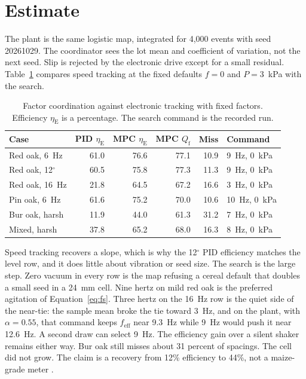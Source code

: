 \documentclass[11pt,a4paper]{article}
\begin{document}
\section{Estimate}

The plant is the same logistic map, integrated for 4{,}000 events with seed 20261029. The coordinator sees the lot mean and coefficient of variation, not the next seed. Slip is rejected by the electronic drive except for a small residual. Table~\ref{tab:m} compares speed tracking at the fixed defaults $f=0$ and $P=3$~kPa with the search.

\begin{table}[ht]
\centering
\caption{Factor coordination against electronic tracking with fixed factors. Efficiency $\eta_{\mathrm{E}}$ is a percentage. The search command is the recorded run.}
\label{tab:m}
\small
\begin{tabular}{@{}lrrrrl@{}}
\toprule
Case & PID $\eta_{\mathrm{E}}$ & MPC $\eta_{\mathrm{E}}$ & MPC $Q_{\mathrm{f}}$ & Miss & Command \\
\midrule
Red oak, 6~Hz & 61.0 & 76.6 & 77.1 & 10.9 & 9~Hz, 0~kPa \\
Red oak, 12$^\circ$ & 60.5 & 75.8 & 77.3 & 11.3 & 9~Hz, 0~kPa \\
Red oak, 16~Hz & 21.8 & 64.5 & 67.2 & 16.6 & 3~Hz, 0~kPa \\
Pin oak, 6~Hz & 61.6 & 75.2 & 70.0 & 10.6 & 10~Hz, 0~kPa \\
Bur oak, harsh & 11.9 & 44.0 & 61.3 & 31.2 & 7~Hz, 0~kPa \\
Mixed, harsh & 37.8 & 65.2 & 68.0 & 16.3 & 8~Hz, 0~kPa \\
\bottomrule
\end{tabular}
\end{table}

Speed tracking recovers a slope, which is why the 12$^\circ$ PID efficiency matches the level row, and it does little about vibration or seed size. The search is the large step. Zero vacuum in every row is the map refusing a cereal default that doubles a small seed in a 24~mm cell. Nine hertz on mild red oak is the preferred agitation of Equation~\eqref{eq:fs}. Three hertz on the 16~Hz row is the quiet side of the near-tie: the sample mean broke the tie toward 3~Hz, and on the plant, with $\alpha=0.55$, that command keeps $f_{\mathrm{eff}}$ near 9.3~Hz while 9~Hz would push it near 12.6~Hz. A second draw can select 9~Hz. The efficiency gain over a silent shaker remains either way. Bur oak still misses about 31 percent of spacings. The cell did not grow. The claim is a recovery from 12\% efficiency to 44\%, not a maize-grade meter \cite{wells1990,kachman1995}.
\end{document}
